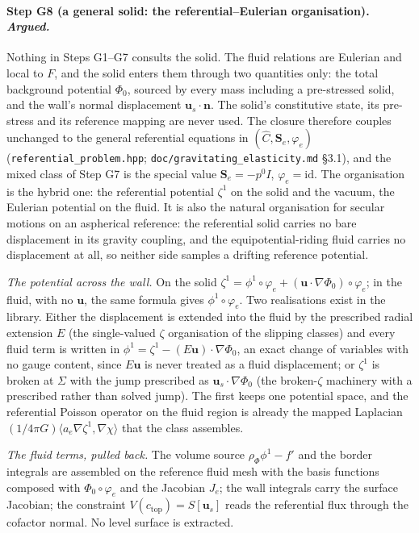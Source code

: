 \documentclass[11pt]{article}
\newcommand{\bu}{\mathbf{u}}
\newcommand{\bn}{\mathbf{n}}
\newcommand{\code}[1]{\texttt{#1}}
\begin{document}
\paragraph{Step G8 (a general solid: the referential--Eulerian
organisation). \emph{Argued.}} Nothing in Steps G1--G7 consults the
solid. The fluid relations are Eulerian and local to $F$, and the solid
enters them through two quantities only: the total background potential
$\Phi_0$, sourced by every mass including a pre-stressed solid, and the
wall's normal displacement $\bu_s\cdot\bn$. The solid's constitutive
state, its pre-stress and its reference mapping are never used. The
closure therefore couples unchanged to the general referential
equations in $(\hat C, \mathbf S_e, \varphi_e)$
(\code{referential\_problem.hpp}; \code{doc/gravitating\_elasticity.md}
\S3.1), and the mixed class of Step G7 is the special value
$\mathbf S_e = -p^0 I$, $\varphi_e = \mathrm{id}$. The organisation is
the hybrid one: the referential potential $\zeta^1$ on the solid and
the vacuum, the Eulerian potential on the fluid. It is also the natural
organisation for secular motions on an aspherical reference: the
referential solid carries no bare displacement in its gravity coupling,
and the equipotential-riding fluid carries no displacement at all, so
neither side samples a drifting reference potential.

\emph{The potential across the wall.} On the solid $\zeta^1 =
\phi^1\circ\varphi_e + (\bu\cdot\nabla\Phi_0)\circ\varphi_e$; in the
fluid, with no $\bu$, the same formula gives $\phi^1\circ\varphi_e$. Two
realisations exist in the library. Either the displacement is extended
into the fluid by the prescribed radial extension $E$ (the single-valued
$\zeta$ organisation of the slipping classes) and every fluid term is
written in $\phi^1 = \zeta^1 - (E\bu)\cdot\nabla\Phi_0$, an exact change
of variables with no gauge content, since $E\bu$ is never treated as a
fluid displacement; or $\zeta^1$ is broken at $\Sigma$ with the jump
prescribed as $\bu_s\cdot\nabla\Phi_0$ (the broken-$\zeta$ machinery with
a prescribed rather than solved jump). The first keeps one potential
space, and the referential Poisson operator on the fluid region is
already the mapped Laplacian $(1/4\pi G)\langle a_e\nabla\zeta^1,\nabla\chi\rangle$
that the class assembles.

\emph{The fluid terms, pulled back.} The volume source $\rho_\Phi\phi^1
- f'$ and the border integrals are assembled on the reference fluid
mesh with the basis functions composed with $\Phi_0\circ\varphi_e$ and
the Jacobian $J_e$; the wall integrals carry the surface Jacobian; the
constraint $V(c_{\mathrm{top}}) = S[\bu_s]$ reads the referential flux
through the cofactor normal. No level surface is extracted.
\end{document}
